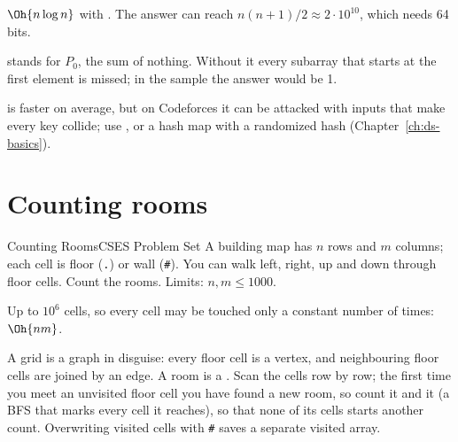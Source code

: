  $\Oh{n\log n}$ with . The answer can reach $n(n+1)/2 \approx 2\cdot10^{10}$, which needs 64 bits.

\begin{pitfall}
 stands for $P_0$, the sum of nothing. Without it every subarray that starts at the first element is
missed; in the sample the answer would be 1.
\end{pitfall}

\begin{tip}
 is faster on average, but on Codeforces it can be attacked with inputs that make every key collide; use
, or a hash map with a randomized hash (Chapter~\ref{ch:ds-basics}).
\end{tip}

\section[Counting rooms]{Counting rooms \hfill \silver}\label{wp:rooms}

\begin{statement}{Counting Rooms}{CSES Problem Set}
A building map has $n$ rows and $m$ columns; each cell is floor (\texttt{.}) or wall (\texttt{\#}). You can walk left,
right, up and down through floor cells. Count the rooms. Limits: $n, m \le 1000$.
\end{statement}

 Up to $10^6$ cells, so every cell may be touched only a constant number of times: $\Oh{nm}$.

 A grid is a graph in disguise: every floor cell is a vertex, and neighbouring floor cells are joined by
an edge. A room is a . Scan the cells row by row; the first time you meet an unvisited floor cell
you have found a new room, so count it and  it (a BFS that marks every cell it reaches), so that none of
its cells starts another count. Overwriting visited cells with \texttt{\#} saves a separate visited array.

